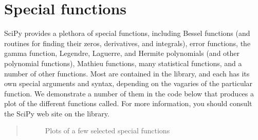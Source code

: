 \documentclass[letterpaper,10pt,english]{sphinxmanual}
\begin{document}
\section{Special functions}
\label{chap9/chap9_scipy:index-0}\label{chap9/chap9_scipy:specfunc}\label{chap9/chap9_scipy:special-functions}
SciPy provides a plethora of special functions, including Bessel functions (and routines for finding their zeros, derivatives, and integrals), error functions, the gamma function, Legendre, Laguerre, and Hermite polynomials (and other polynomial functions), Mathieu functions, many statistical functions, and a number of other functions.  Most are contained in the  library, and each has its own special arguments and syntax, depending on the vagaries of the particular function.  We demonstrate a number of them in the code below that produces a plot of the different functions called.  For more information, you should consult the SciPy web site on the  library.
\begin{quote}
\begin{figure}[htbp]
\centering
\capstart

\caption{Plots of a few selected special functions}\label{chap9/chap9_scipy:fig-specfuncplots}\end{figure}
\end{quote}
\end{document}
